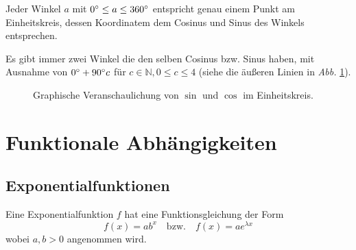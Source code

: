 \documentclass[twocolumn]{article}
\newcommand{\figref}[1]{\emph{Abb.} \ref{#1}}
\begin{document}
Jeder Winkel $a$ mit $0\degree \leq a \leq 360\degree$ entspricht genau einem Punkt am Einheitskreis, dessen Koordinatem dem Cosinus und Sinus des Winkels entsprechen.

Es gibt immer zwei Winkel die den selben Cosinus bzw. Sinus haben, mit Ausnahme von $0\degree + 90\degree c$ für $c \in \mathbb{N}, 0 \leq c \leq 4$ (siehe die äußeren Linien in \figref{fig:sin_cos_example}).

\begin{figure}[H]
    \centering
    \caption{Graphische Veranschaulichung von $\sin$ und $\cos$ im Einheitskreis.}
    \label{fig:sin_cos_example}
\end{figure}

\section{Funktionale Abhängigkeiten}

\subsection{Exponentialfunktionen}

Eine Exponentialfunktion $f$ hat eine Funktionsgleichung der Form
\begin{equation}\label{eq:exp_func1}
    f(x) = ab^x\quad \mathrm{bzw.}\quad f(x) = ae^{\lambda x}
\end{equation}
wobei $a, b > 0$ angenommen wird.
\end{document}
